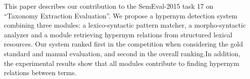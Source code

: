 This paper describes our contribution to the SemEval-2015 task 17 on ``Taxonomy Extraction Evaluation''. We propose a hypernym detection system combining three modules: a lexico-syntactic pattern matcher, a morpho-syntactic analyzer and a module retrieving hypernym relations from structured lexical resources. Our system ranked first in the competition when considering the gold standard and manual evaluation, and second in the overall ranking.In addition, the experimental results show that all modules contribute to finding hypernym relations between terms.
